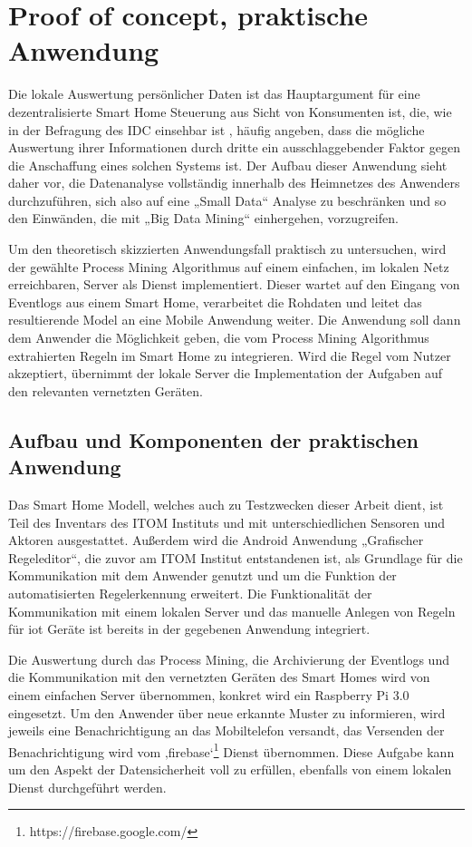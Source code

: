 \chapter{Proof of concept, praktische Anwendung}\label{chap:experiments}
Die lokale Auswertung persönlicher Daten ist das Hauptargument für eine dezentralisierte Smart Home Steuerung aus Sicht von Konsumenten ist, die, wie in der Befragung des IDC einsehbar ist \cite{IDC}, häufig angeben, dass die mögliche Auswertung ihrer Informationen durch dritte ein ausschlaggebender Faktor gegen die Anschaffung eines solchen Systems ist. 
Der Aufbau dieser Anwendung sieht daher vor, die Datenanalyse vollständig innerhalb des Heimnetzes des Anwenders durchzuführen, sich also auf eine „Small Data“ Analyse zu beschränken und so den Einwänden, die mit „Big Data Mining“ einhergehen, vorzugreifen. 

Um den theoretisch skizzierten Anwendungsfall praktisch zu untersuchen, wird der gewählte Process Mining Algorithmus auf einem einfachen, im lokalen Netz erreichbaren, Server als Dienst implementiert. Dieser wartet auf den Eingang von Eventlogs aus einem Smart Home, verarbeitet die Rohdaten und leitet das resultierende Model an eine Mobile Anwendung weiter. Die Anwendung soll dann dem Anwender die Möglichkeit geben, die vom Process Mining Algorithmus extrahierten Regeln im Smart Home zu integrieren. Wird die Regel vom Nutzer akzeptiert, übernimmt der lokale Server die Implementation der Aufgaben auf den relevanten vernetzten Geräten.

\section{Aufbau und Komponenten der praktischen Anwendung}
Das Smart Home Modell, welches auch zu Testzwecken dieser Arbeit  dient, ist Teil des Inventars des ITOM Instituts und mit unterschiedlichen Sensoren und Aktoren ausgestattet. 
Außerdem wird die Android Anwendung „Grafischer Regeleditor“, die zuvor am ITOM Institut entstandenen ist, als Grundlage für die Kommunikation mit dem Anwender genutzt und um die Funktion der automatisierten Regelerkennung erweitert. 
Die Funktionalität der Kommunikation mit einem lokalen Server und das manuelle Anlegen von Regeln für iot Geräte ist bereits in der gegebenen Anwendung integriert.

Die Auswertung durch das Process Mining, die Archivierung der Eventlogs und die Kommunikation mit den vernetzten Geräten des Smart Homes wird von einem einfachen Server übernommen, konkret wird ein Raspberry Pi 3.0 eingesetzt. Um den Anwender über neue erkannte Muster zu informieren, wird jeweils eine Benachrichtigung an das Mobiltelefon versandt, das Versenden der Benachrichtigung wird vom ‚firebase‘\footnote{https://firebase.google.com/} Dienst übernommen. Diese Aufgabe kann um den Aspekt der Datensicherheit voll zu erfüllen, ebenfalls von einem lokalen Dienst durchgeführt werden.

